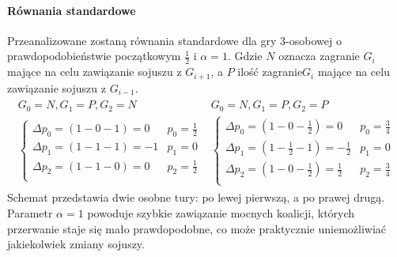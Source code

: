 \paragraph{Równania standardowe}
Przeanalizowane zostaną równania standardowe dla gry 3-osobowej o prawdopodobieństwie początkowym $\frac{1}{2}$ i $\alpha = 1$. Gdzie $N$ oznacza zagranie $G_i$ mające na celu zawiązanie sojuszu z $G_{i+1}$, a $P$ ilość zagranie$G_i$ mające na celu zawiązanie sojuszu z $G_{i-1}$.
\begin{align*}
\begin{array}{cc}
G_0 = N, G_1 = P, G_2 = N & G_0 = N, G_1 = P, G_2 = P\\
\left\{
\begin{array}{ll}
\Delta p_0 = (1 - 0 - 1) =  0 & p_0=\frac{1}{2}\\
\Delta p_1 = (1 - 1 - 1) =  -1 & p_1= 0\\
\Delta p_2 = (1 - 1 - 0) =  0 & p_2=\frac{1}{2}\\
\end{array} 
\right. &
\left\{
\begin{array}{ll}
\Delta p_0 = (1 - 0 - \frac{1}{2}) =  0 & p_0=\frac{3}{4}\\
\Delta p_1 = (1 - \frac{1}{2} - 1) =  -\frac{1}{2} & p_1= 0\\
\Delta p_2 = (1 - 0 - \frac{1}{2}) =  \frac{1}{2} & p_2=\frac{3}{4}\\
\end{array}
\right.
\end{array}
\end{align*}
Schemat przedstawia dwie osobne tury: po lewej pierwszą, a po prawej drugą. Parametr $\alpha=1$ powoduje szybkie zawiązanie mocnych koalicji, których przerwanie staje się mało prawdopodobne, co może praktycznie uniemożliwiać jakiekolwiek zmiany sojuszy.

